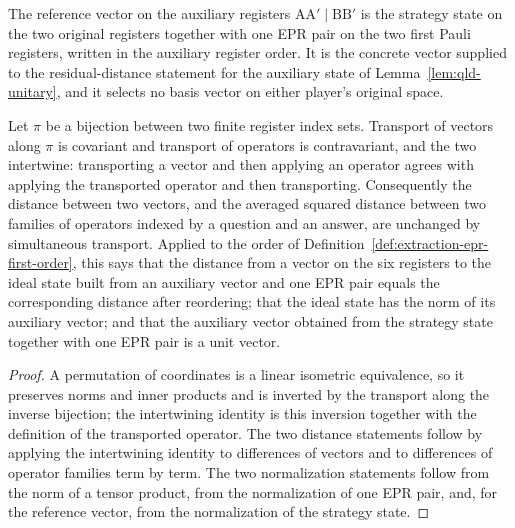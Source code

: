 \begin{definition}\label{def:extraction-aux-reference}
	\leanok
	The reference vector on the auxiliary registers $\mathrm{A}\mathrm{A}' \mid \mathrm{B}\mathrm{B}'$ is the strategy state on the two original registers together with one EPR pair on the two first Pauli registers, written in the auxiliary register order.  It is the concrete vector supplied to the residual-distance statement for the auxiliary state of Lemma~\ref{lem:qld-unitary}, and it selects no basis vector on either player's original space.
\end{definition}

\begin{lemma}\label{lem:extraction-register-transport-support}
	\leanok
	Let $\pi$ be a bijection between two finite register index sets.  Transport of vectors along $\pi$ is covariant and transport of operators is contravariant, and the two intertwine: transporting a vector and then applying an operator agrees with applying the transported operator and then transporting.  Consequently the distance between two vectors, and the averaged squared distance between two families of operators indexed by a question and an answer, are unchanged by simultaneous transport.  Applied to the order of Definition~\ref{def:extraction-epr-first-order}, this says that the distance from a vector on the six registers to the ideal state built from an auxiliary vector and one EPR pair equals the corresponding distance after reordering; that the ideal state has the norm of its auxiliary vector; and that the auxiliary vector obtained from the strategy state together with one EPR pair is a unit vector.
\end{lemma}
\begin{proof}
	\leanok
	A permutation of coordinates is a linear isometric equivalence, so it preserves norms and inner products and is inverted by the transport along the inverse bijection; the intertwining identity is this inversion together with the definition of the transported operator.  The two distance statements follow by applying the intertwining identity to differences of vectors and to differences of operator families term by term.  The two normalization statements follow from the norm of a tensor product, from the normalization of one EPR pair, and, for the reference vector, from the normalization of the strategy state.
\end{proof}

